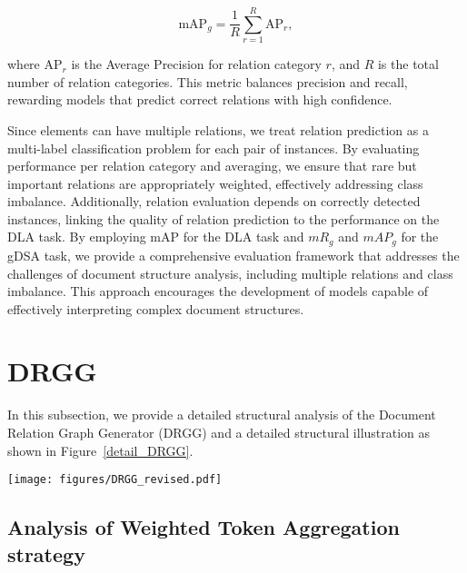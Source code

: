 \begin{equation}
    \text{mAP}_g = \frac{1}{R} \sum_{r=1}^{R} \text{AP}_{r},
\end{equation}

where $ \text{AP}_{r} $ is the Average Precision for relation category $ r $, and $ R $ is the total number of relation categories. This metric balances precision and recall, rewarding models that predict correct relations with high confidence.

Since elements can have multiple relations, we treat relation prediction as a multi-label classification problem for each pair of instances. By evaluating performance per relation category and averaging, we ensure that rare but important relations are appropriately weighted, effectively addressing class imbalance. Additionally, relation evaluation depends on correctly detected instances, linking the quality of relation prediction to the performance on the DLA task. By employing mAP for the DLA task and $mR_g$ and $mAP_g$ for the gDSA task, we provide a comprehensive evaluation framework that addresses the challenges of document structure analysis, including multiple relations and class imbalance. This approach encourages the development of models capable of effectively interpreting complex document structures.

\section{DRGG}
\label{appendix_drgg}
In this subsection, we provide a detailed structural analysis of the Document Relation Graph Generator (DRGG) {and a detailed structural illustration as shown in Figure~\ref{detail_DRGG}}.

\begin{figure*}
    \centering
    \texttt{[image: figures/DRGG\_revised.pdf]}
    \caption{{The overall architecture and the work flow of the proposed DRGG model. Given an image of document as input, the backbone will extract the feature from the document image and forward to the Encoder-Decoder architecture. The output of Decoder will be forwarded to the object heads and the relation heads for the prediction of document layouts and relations. }}
    \label{detail_DRGG}
\end{figure*}

\subsection{Analysis of Weighted Token Aggregation strategy}

